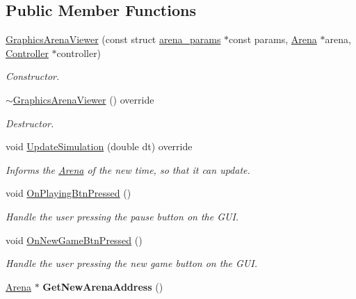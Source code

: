 \subsection*{Public Member Functions}
\begin{DoxyCompactItemize}
\item 
\hyperlink{classGraphicsArenaViewer_a869510833897508300da65b1eb0c5d09}{Graphics\+Arena\+Viewer} (const struct \hyperlink{structarena__params}{arena\+\_\+params} $\ast$const params, \hyperlink{classArena}{Arena} $\ast$arena, \hyperlink{classController}{Controller} $\ast$controller)
\begin{DoxyCompactList}\small\item\em Constructor. \end{DoxyCompactList}\item 
\hyperlink{classGraphicsArenaViewer_a88cea02aab1550a7f315fbf4f3868109}{$\sim$\+Graphics\+Arena\+Viewer} () override
\begin{DoxyCompactList}\small\item\em Destructor. \end{DoxyCompactList}\item 
void \hyperlink{classGraphicsArenaViewer_aeec66666382aa0312574d70aa58de250}{Update\+Simulation} (double dt) override
\begin{DoxyCompactList}\small\item\em Informs the \hyperlink{classArena}{Arena} of the new time, so that it can update. \end{DoxyCompactList}\item 
void \hyperlink{classGraphicsArenaViewer_a7cc65fd0e2e8c1f6138608e398c7c887}{On\+Playing\+Btn\+Pressed} ()
\begin{DoxyCompactList}\small\item\em Handle the user pressing the pause button on the G\+UI. \end{DoxyCompactList}\item 
void \hyperlink{classGraphicsArenaViewer_a7a573f7f55d54fd066d3d47df7a6454b}{On\+New\+Game\+Btn\+Pressed} ()
\begin{DoxyCompactList}\small\item\em Handle the user pressing the new game button on the G\+UI. \end{DoxyCompactList}\item 
\hyperlink{classArena}{Arena} $\ast$ {\bfseries Get\+New\+Arena\+Address} ()\hypertarget{classGraphicsArenaViewer_add403850506359da3cf6155fc13b1744}{}\label{classGraphicsArenaViewer_add403850506359da3cf6155fc13b1744}


\end{DoxyCompactItemize}
